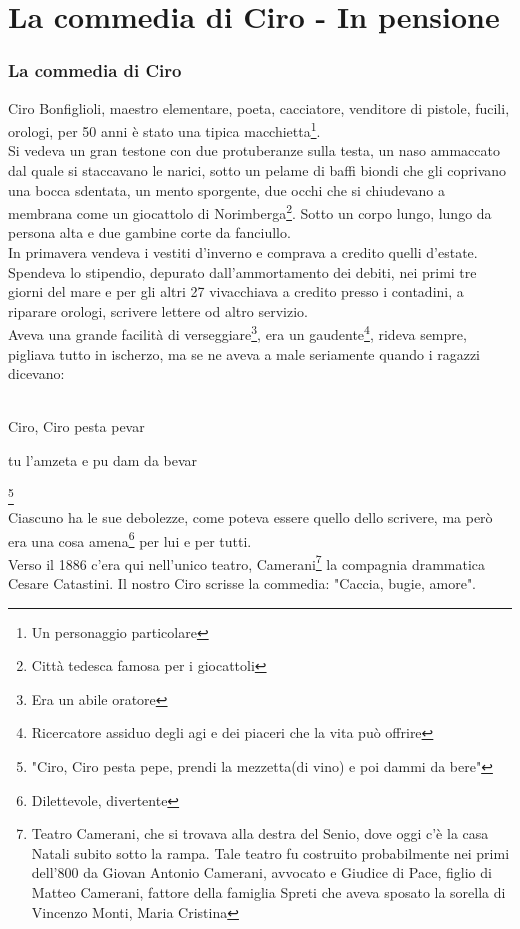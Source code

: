 \documentclass[10pt]{memoir} %
\begin{document}

\chapter{La commedia di Ciro - In pensione}
\subsection{La commedia di Ciro}
Ciro Bonfiglioli, maestro elementare, poeta, cacciatore, venditore di pistole, fucili, orologi, per 50 anni è stato una tipica macchietta\footnote{Un personaggio particolare}.\\
Si vedeva un gran testone con due protuberanze sulla testa, un naso ammaccato dal quale si staccavano le narici, sotto un pelame di baffi biondi che gli coprivano una bocca sdentata, un mento sporgente, due occhi che si chiudevano a membrana come un giocattolo di Norimberga\footnote{Città tedesca famosa per i giocattoli}. Sotto un corpo lungo, lungo da persona alta e due gambine corte da fanciullo.
\\In primavera vendeva i vestiti d'inverno e comprava a credito quelli d'estate. Spendeva lo stipendio, depurato dall'ammortamento dei debiti, nei primi tre giorni del mare e per gli altri 27 vivacchiava a credito presso i contadini, a riparare orologi, scrivere lettere od altro servizio. \\
Aveva una grande facilità di verseggiare\footnote{Era un abile oratore}, era un gaudente\footnote{Ricercatore assiduo degli agi e dei piaceri che la vita può offrire}, rideva sempre, pigliava tutto in ischerzo, ma se ne aveva a male seriamente quando i ragazzi dicevano: \\\\
\textcal \Huge
	\centerline{Ciro, Ciro pesta pevar}
	\centerline{tu l'amzeta e pu dam da bevar}\footnote{"Ciro, Ciro pesta pepe, prendi la mezzetta(di vino) e poi dammi da bere"}
\normalfont \normalsize
{}\\
Ciascuno ha le sue debolezze, come poteva essere quello dello scrivere, ma però era una cosa amena\footnote{Dilettevole, divertente} per lui e per tutti. \\
Verso il 1886 c'era qui nell'unico teatro, Camerani\footnote{Teatro Camerani, che si trovava alla destra del Senio, dove oggi c'è la casa Natali subito sotto la rampa. Tale teatro fu costruito probabilmente nei primi dell'800 da Giovan Antonio Camerani, avvocato e Giudice di Pace, figlio di Matteo Camerani, fattore della famiglia Spreti che aveva sposato la sorella di Vincenzo Monti, Maria Cristina} la compagnia drammatica Cesare Catastini. Il nostro Ciro scrisse la commedia: "Caccia, bugie, amore". 
\end{document}
